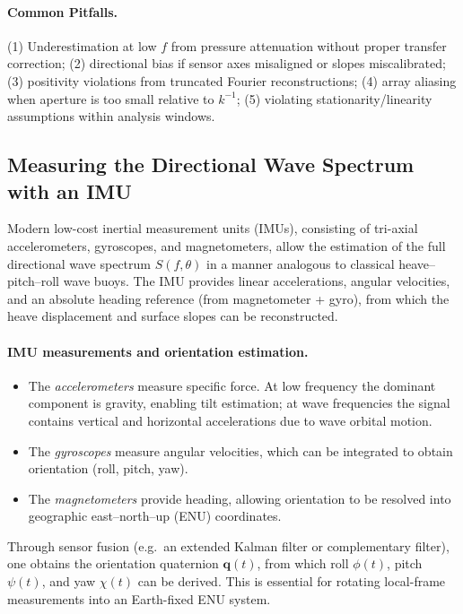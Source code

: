 \documentclass[11pt,letterpaper]{article}
\begin{document}
\paragraph{Common Pitfalls.}
(1) Underestimation at low $f$ from pressure attenuation without proper transfer correction; (2) directional bias if sensor axes misaligned or slopes miscalibrated; (3) positivity violations from truncated Fourier reconstructions; (4) array aliasing when aperture is too small relative to $k^{-1}$; (5) violating stationarity/linearity assumptions within analysis windows.


\subsection{Measuring the Directional Wave Spectrum with an IMU}
\label{subsec:imu-directional-spectrum}

Modern low-cost inertial measurement units (IMUs), consisting of tri-axial accelerometers, gyroscopes, and magnetometers, allow the estimation of the full directional wave spectrum $S(f,\theta)$ in a manner analogous to classical heave--pitch--roll wave buoys. The IMU provides linear accelerations, angular velocities, and an absolute heading reference (from magnetometer + gyro), from which the heave displacement and surface slopes can be reconstructed.

\paragraph{IMU measurements and orientation estimation.}
\begin{itemize}
  \item The \emph{accelerometers} measure specific force. At low frequency the dominant component is gravity, enabling tilt estimation; at wave frequencies the signal contains vertical and horizontal accelerations due to wave orbital motion.
  \item The \emph{gyroscopes} measure angular velocities, which can be integrated to obtain orientation (roll, pitch, yaw).
  \item The \emph{magnetometers} provide heading, allowing orientation to be resolved into geographic east--north--up (ENU) coordinates.
\end{itemize}
Through sensor fusion (e.g.\ an extended Kalman filter or complementary filter), one obtains the orientation quaternion $\mathbf{q}(t)$, from which roll $\phi(t)$, pitch $\psi(t)$, and yaw $\chi(t)$ can be derived. This is essential for rotating local-frame measurements into an Earth-fixed ENU system.
\end{document}
